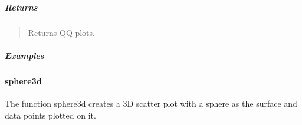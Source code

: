 \documentclass[letterpaper,10pt,english,openany,oneside]{sphinxmanual}
\begin{document}
{{{{\begin{fulllineitems}
\subparagraph{Returns}
\label{\detokenize{api_reference/generated/QuadratiK.tools.qq_plot:returns}}\begin{quote}

\sphinxAtStartPar
Returns QQ plots.
\end{quote}


\subparagraph{Examples}
\label{\detokenize{api_reference/generated/QuadratiK.tools.qq_plot:examples}}
\begin{sphinxVerbatim}[commandchars=\\\{\}]
   
   
  
\end{sphinxVerbatim}

\end{fulllineitems}




\sphinxstepscope


\paragraph{sphere3d}
\label{\detokenize{api_reference/generated/QuadratiK.tools.sphere3d:sphere3d}}\label{\detokenize{api_reference/generated/QuadratiK.tools.sphere3d::doc}}

\begin{fulllineitems}
\label{\detokenize{api_reference/generated/QuadratiK.tools.sphere3d:QuadratiK.tools.sphere3d}}
\pysigstartsignatures
{}
\pysigstopsignatures
\sphinxAtStartPar
The function sphere3d creates a 3D scatter plot with a sphere
as the surface and data points plotted on it.



\end{fulllineitems}}}}}
\end{document}
